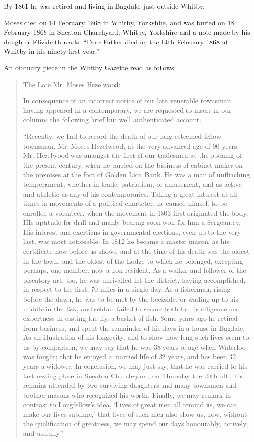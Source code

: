 By 1861 he was retired and living in Bagdale, just outside Whitby.\cite{MHezelwood1861}

Moses died on 14 February 1868 in Whitby, Yorkshire, and was buried on 18 February 1868 in Sneaton Churchyard, Whitby, Yorkshire\cite{MHezelwoodDeath}
and a note made by his daughter Elizabeth reads: ``Dear Father died on the 14th February 1868 at Whitby in his ninety-first year.''

An obituary piece in the Whitby Gazette read as follows:\cite{MHezelwoodDeathnotice}

\begin{quotation}
The Late Mr. Moses Hezelwood:

In consequence of an incorrect notice of our late venerable townsman having appeared in a contemporary,
we are requested to insert in our columns the following brief but well authenticated account.

``Recently, we had to record the death of our long esteemed fellow townsman, Mr. Moses Hezelwood, at the very advanced age of 90 years.
Mr. Hezelwood was amongst the first of our tradesmen at the opening of the present century,
when he carried on the business of cabinet maker on the premises at the foot of Golden Lion Bank.
He was a man of unflinching temperament, whether in trade, patriotism, or amusement, and as active and athletic as any of his contemporaries.
Taking a great interest at all times in movements of a political character, he caused himself to be enrolled a volunteer,
when the movement in 1803 first originated the body. HIs aptitude for drill and manly bearing soon won for him a Sergeantcy.
His interest and exertions in governmental elections, even up to the very last, was most noticeable.
In 1812 he became a master mason, as his certificate now before us shows, and at the time of his death was the oldest in the town,
and the oldest of the Lodge to which he belonged, excepting perhaps, one member, now a non-resident.
As a walker and follower of the piscatory art, too, he was unrivalled int the district, having accomplished,
in respect to the first, 70 miles in a single day. As a fisherman, rising before the dawn, he was to be met by the beckside,
or wading up to his middle in the Esk, and seldom failed to secure both by his diligence and expertness in casting the fly,
a basket of fish. Some years ago he retired from business, and spent the remainder of his days in a house in Bagdale.
As an illustration of his longevity, and to show how long such lives seem to us by comparison,
we may say that he was 38 years of age when Waterloo was fought; that he enjoyed a married life of 32 years,
and has been 32 years a widower. In conclusion, we may just say, that he was carried to his last resting place in Sneaton Church-yard,
on Thursday the 20th ult., his remains attended by two surviving daughters and many townsmen and brother masons who recognized his worth.
Finally, we may remark in contrast to Longfellow's idea, `Lives of great men all remind us, we can make our lives sublime,'
that lives of such men also show us, how, without the qualification of greatness, we may spend our days honourably, actively, and usefully.''
\end{quotation}
